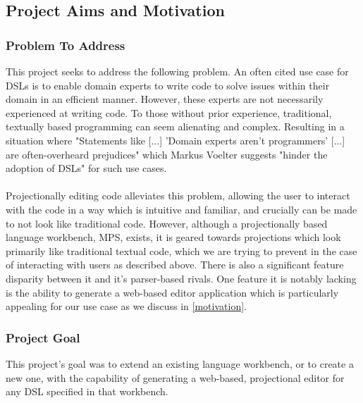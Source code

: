 \documentclass{article}
\begin{document}
\subsection{Project Aims and Motivation}

\subsubsection{Problem To Address}\label{problem}

This project seeks to address the following problem. An often cited use case for DSLs is to enable domain experts to write code to solve issues within their domain in an efficient manner. However, these experts are not necessarily experienced at writing code. To those without prior experience, traditional, textually based programming can seem alienating and complex. Resulting in a situation where "Statements like [...] 'Domain experts aren't programmers' [...] are often-overheard prejudices" which Markus Voelter suggests "hinder the adoption of DSLs" for such use cases\cite{dslEngineering}.
\\
\\
Projectionally editing code alleviates this problem, allowing the user to interact with the code in a way which is intuitive and familiar, and crucially can be made to not look like traditional code. However, although a projectionally based language workbench, MPS\cite{mps}, exists, it is geared towards projections which look primarily like traditional textual code, which we are trying to prevent in the case of interacting with users as described above. There is also a significant feature disparity between it and it's parser-based rivals. One feature it is notably lacking is the ability to generate a web-based editor application which is particularly appealing for our use case as we discuss in \ref{motivation}.

\subsubsection{Project Goal}\label{goal}
This project's goal was to extend an existing language workbench, or to create a new one, with the capability of generating a web-based, projectional editor for any DSL specified in that workbench. 
\end{document}
